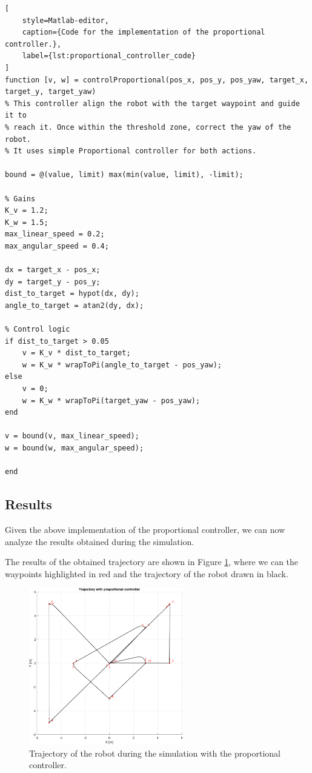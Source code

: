 \begin{lstlisting}[
    style=Matlab-editor,
    caption={Code for the implementation of the proportional controller.},
    label={lst:proportional_controller_code}
]
function [v, w] = controlProportional(pos_x, pos_y, pos_yaw, target_x, target_y, target_yaw)
% This controller align the robot with the target waypoint and guide it to
% reach it. Once within the threshold zone, correct the yaw of the robot.
% It uses simple Proportional controller for both actions.

bound = @(value, limit) max(min(value, limit), -limit);

% Gains
K_v = 1.2;
K_w = 1.5;
max_linear_speed = 0.2;
max_angular_speed = 0.4;

dx = target_x - pos_x;
dy = target_y - pos_y;
dist_to_target = hypot(dx, dy);
angle_to_target = atan2(dy, dx);

% Control logic
if dist_to_target > 0.05
    v = K_v * dist_to_target;
    w = K_w * wrapToPi(angle_to_target - pos_yaw);
else
    v = 0;
    w = K_w * wrapToPi(target_yaw - pos_yaw);
end

v = bound(v, max_linear_speed);
w = bound(w, max_angular_speed);

end
\end{lstlisting}



\subsection{Results}
\label{subsec:results_proportional_controller}

Given the above implementation of the proportional controller, we can now analyze the results obtained during the simulation.

The results of the obtained trajectory are shown in Figure \ref{fig:proportional_controller_trajectory}, where we can the waypoints highlighted in red and the trajectory of the robot drawn in black.

\begin{figure}[H]
    \centering
    \includegraphics[width=0.6\textwidth]{./img/MATLAB/trajectory_proportional.pdf}
    \caption{Trajectory of the robot during the simulation with the proportional controller.}
    \label{fig:proportional_controller_trajectory}
\end{figure}

